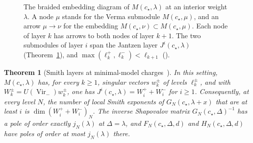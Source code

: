 \documentclass[twoside,10pt]{article}
\numberwithin{equation}{section}
\theoremstyle{slbody}
\newtheorem{theorem}{Theorem}[section]
\theoremstyle{definition}
\theoremstyle{remark}
\newcommand{\Vir}{\operatorname{Vir}}
\begin{document}
\begin{figure}[ht]
\centering
{}
\caption{The braided embedding diagram of \(M(c_\star,\lambda)\) at an
interior weight \(\lambda\).  A node \(\mu\) stands for the Verma submodule
\(M(c_\star,\mu)\), and an arrow \(\mu\to\nu\) for the embedding
\(M(c_\star,\nu)\subset M(c_\star,\mu)\).  Each node of layer \(k\) has arrows to
both nodes of layer \(k+1\).  The two submodules of layer \(i\) span the
Jantzen layer \(J^i(c_\star,\lambda)\) (Theorem~\ref{thm:jantzen-smith}), and
\(\max(\ell^+_k,\ell^-_k)<\ell_{k+1}\) (\cite[Section~8]{PolzerColliding2026}).}
\label{fig:braided}
\end{figure}

\begin{theorem}[Smith layers at minimal-model charges~{\cite[Theorem~8.1]{PolzerColliding2026}}]
\label{thm:jantzen-smith}
In this setting, \(M(c_\star,\lambda)\) has, for every \(k\geq1\), singular
vectors \(w^\pm_k\) of levels \(\ell^\pm_k\), and with
\(W^\pm_k=U(\Vir_-)w^\pm_k\), one has
\(J^i(c_\star,\lambda)=W^+_i+W^-_i\) for \(i\geq1\).  Consequently, at every
level \(N\), the number of local Smith exponents of \(G_N(c_\star,\lambda+x)\)
that are at least \(i\) is \(\dim(W^+_i+W^-_i)_N\).  The inverse Shapovalov
matrix \(G_N(c_\star,\Delta)^{-1}\) has a pole of order exactly
\(j_N(\lambda)\) at \(\Delta=\lambda\), and \(F_N(c_\star,\Delta,d)\) and
\(H_N(c_\star,\Delta,d)\) have poles of order at most \(j_N(\lambda)\)
there.
\end{theorem}
\end{document}
